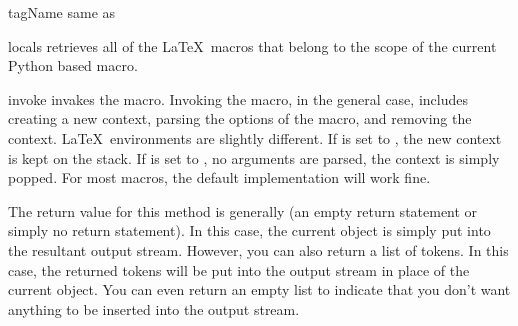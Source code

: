 \documentclass{manual}
\begin{document}
\begin{memberdesc}[Macro]{tagName}
same as 
\end{memberdesc}

\begin{methoddesc}[Macro]{locals}{}
retrieves all of the \LaTeX\ macros that belong to the scope of the
current Python based macro.
\end{methoddesc}

\begin{methoddesc}[Macro]{invoke}{}
invakes the macro.  Invoking the macro, in the general case, includes 
creating a new context, parsing the options of the macro, and removing 
the context.  \LaTeX\ environments are slightly different.  If 
 is set to , the new context
is kept on the stack.  If  is set to ,
no arguments are parsed, the context is simply popped.  For most macros, the
default implementation will work fine.

The return value for this method is generally  (an empty return
statement or simply no return statement).  In this case, the current object
is simply put into the resultant output stream.  However, you can also
return a list of tokens.  In this case, the returned tokens will be put 
into the output stream in place of the current object.  You can even 
return an empty list to indicate that you don't want anything to be 
inserted into the output stream.
\end{methoddesc}
\end{document}
